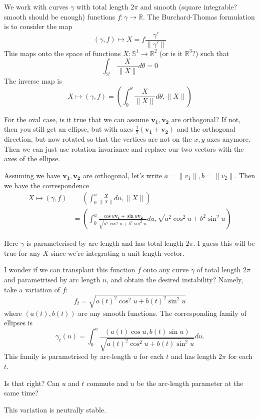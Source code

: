 \documentclass{amsart}
\begin{document}
We work with curves \(\gamma\) with total length \(2\pi\) and smooth (square integrable? smooth should be enough) functions \(f: \gamma \to \mathbb{R}\). The Burchard-Thomas formulation is to consider the map
\[
(\gamma, f) \mapsto X = f \frac{\gamma'}{\|\gamma'\|}
\]
This maps onto the space of functions \(X: \mathbb{S}^1 \to \mathbb{R}^2\) (or is it \(\mathbb{R}^3\)?) such that
\[
\int_{\mathbb{S}^1} \frac{X}{\|X\|} d\theta = 0
\]
The inverse map is
\[
X \mapsto (\gamma, f) = \left(\int_0^{\theta} \frac{X}{\|X\|} d\theta, \|X\|\right)
\]

For the oval case, is it true that we can assume \(\mathbf{v_1}, \mathbf{v_2}\) are orthogonal? If not, then you still get an ellipse, but with axes \(\tfrac{1}{2} (\mathbf{v_1} +  \mathbf{v_2})\) and the orthogonal direction, but now rotated so that the vertices are not on the \(x,y\) axes anymore. Then we can just use rotation invariance and replace our two vectors with the axes of the ellipse.

Assuming we have \(\mathbf{v_1}, \mathbf{v_2}\) are orthogonal, let's write 
\(a = \|v_1\|, b = \|v_2\|\). Then we have the correspondence 
\[
\begin{split}
X \mapsto (\gamma, f) &= \left(\int_0^{u} \frac{X}{\|X\|} du, \|X\|\right) \\
&= \left(\int_0^{u} \frac{\cos u \mathbf{v_1} + \sin u \mathbf{v_2}}{\sqrt{a^2 \cos^2 u + b^2 \sin^2 u}} du, \sqrt{a^2 \cos^2 u + b^2 \sin^2 u} \right)
\end{split}
\]

Here \(\gamma\) is parameterised by arc-length and has total length \(2\pi\). I guess this will be true for any \(X\) since we're integrating a unit length vector. 

I wonder if we can transplant this function \(f\) onto any curve \(\gamma\)  of total length \(2\pi\) and parametrised by arc length \(u\), and obtain the desired instability? Namely, take a variation of \(f\):
\[
f_t = \sqrt{a(t)^2 \cos^2 u + b(t)^2 \sin^2 u}
\]
where \((a(t), b(t))\) are any smooth functions. The corresponding family of ellipses is
\[
\gamma_t(u) = \int_0^u \frac{(a(t) \cos u, b(t) \sin u)}{\sqrt{a(t)^2 \cos^2 u + b(t) \sin^2 u}} du.
\]
This family is parametrised by arc-length \(u\) for each \(t\) and has length \(2\pi\) for each \(t\).

Is that right? Can \(u\) and \(t\) commute and \(u\) be the arc-length parameter at the same time?

This variation is neutrally stable.
\end{document}
